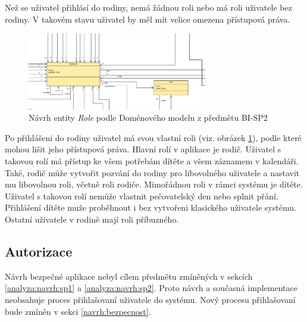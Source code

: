         Než se uživatel přihlásí do rodiny, nemá žádnou roli nebo má roli uživatele bez rodiny. V takovém stavu uživatel by měl mít velice omezena přístupová práva. 
        
        \begin{figure}
	        \includegraphics[width=0.7\textwidth]{pdfs/Role1}
	        \caption[Návrh \textit{Role}]{Návrh entity \textit{Role} podle Doménového modelu z předmětu BI-SP2}\label{image:Role1}
        \end{figure}
        Po přihlášeni do rodiny uživatel má svou vlastní roli (viz. obrázek \ref{image:Role1}), podle které mohou lišit jeho přístupová práva. Hlavní rolí v aplikace je rodič. Uživatel s takovou rolí má přístup ke všem potřebám dítěte a všem záznamem v kalendáři. Také, rodič může vytvořit pozvání do rodiny pro libovolného uživatele a nastavit mu libovolnou roli, včetně roli rodiče. Mimořádnou roli v rámci systému je dítěte. Uživatel s takovou rolí nemůže vlastnit pečovatelský den nebo splnit přání. Přihlášení dítěte muže proběhnout i bez vytvořeni klasického uživatele systému. Ostatní uživatele v rodině mají roli příbuzného.
    
    \subsection{Autorizace}
        Návrh bezpečné aplikace nebyl cílem předmětu zmíněných v sekcích \ref{analyza:navrh:sp1} a \ref{analyza:navrh:sp2}. Proto návrh a současná implementace neobsahuje proces přihlašovaní uživatele do systému. Nový procesu přihlašovaní bude zmíněn v sekci \ref{navrh:bezpecnost}.
        
